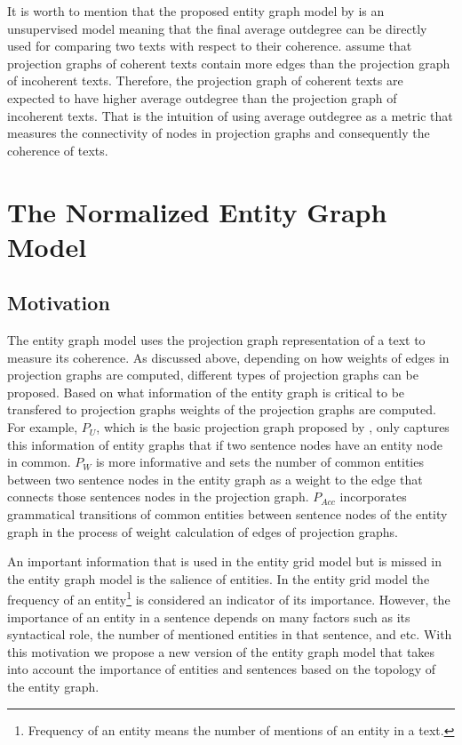 It is worth to mention that the proposed entity graph model by  is an unsupervised model meaning that the final average outdegree can be directly used for comparing two texts with respect to their coherence. 
 assume that projection graphs of coherent texts contain more edges than the projection graph of  incoherent texts. 
Therefore, the projection graph of coherent texts are expected to have higher average outdegree than the projection graph of incoherent texts.  
That is the intuition of using average outdegree as a metric that measures the connectivity of nodes in projection graphs and consequently the coherence of texts. 


\section{The Normalized Entity Graph Model}
%
\subsection{Motivation}
%
The entity graph model uses the projection graph representation of a text to measure its coherence. 
As discussed above, depending on how weights of edges in projection graphs are computed, different types of projection graphs can be proposed. 
Based on what information of the entity graph is critical to be transfered to projection graphs weights of the projection graphs are computed.
For example, $P_U$, which is the basic projection graph proposed by , only captures this information of  entity graphs that if two sentence nodes have an entity node in common. 
$P_W$ is more informative and sets the number of common entities between two sentence nodes in the entity graph as a weight to the edge that connects those sentences nodes in the projection graph. 
$P_{Acc}$ incorporates grammatical transitions of common entities between sentence nodes of the entity graph in the process of weight calculation of edges of projection graphs. 


An important information that is used in the entity grid model but is missed in the entity graph model is the salience of entities. 
In the entity grid model the frequency of an entity\footnote{Frequency of an entity means the number of mentions of an entity in a text.} is considered an indicator of its importance. 
However, the importance of an entity in a sentence depends on many factors such as its syntactical role, the number of mentioned entities in that sentence, and etc. 
With this motivation we propose a new version of the entity graph model that takes into account the importance of entities and sentences based on the topology of the entity graph. 

